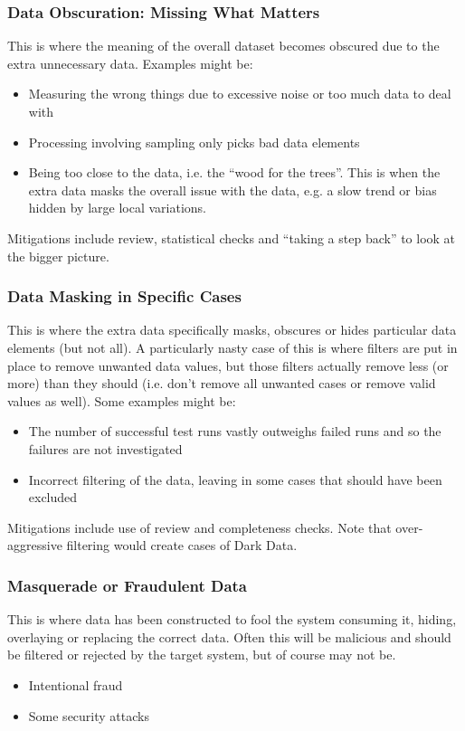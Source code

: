 \subsubsection{Data Obscuration: Missing What Matters}
This is where the meaning of the overall \gls{dataset} becomes obscured due to the extra unnecessary data. Examples might be:
\begin{itemize}
    \item Measuring the wrong things due to excessive noise or too much data to deal with
    \item Processing involving sampling only picks bad data elements
    \item Being too close to the data, i.e. the ``wood for the trees''. This is when the extra data masks the overall issue with the data, e.g. a slow trend or bias hidden by large local variations.
\end{itemize}

Mitigations include review, statistical checks and ``taking a step back'' to look at the bigger picture.
\subsubsection{Data Masking in Specific Cases}
This is where the extra data specifically masks, obscures or hides particular data elements (but not all). A particularly nasty case of this is where filters are put in place to remove unwanted data values, but those filters actually remove less (or more) than they should (i.e. don’t remove all unwanted cases or remove valid values as well). Some examples might be:
\begin{itemize}
    \item The number of successful test runs vastly outweighs failed runs and so the failures are not investigated
    \item Incorrect filtering of the data, leaving in some cases that should have been excluded
\end{itemize}

Mitigations include use of review and completeness checks. Note that over-aggressive filtering would create cases of Dark Data.
\subsubsection{Masquerade or Fraudulent Data}
This is where data has been constructed to fool the system consuming it, hiding, overlaying or replacing the correct data. Often this will be malicious and should be filtered or rejected by the target system, but of course may not be. 
\begin{itemize}
    \item Intentional fraud
    \item Some security attacks
\end{itemize}

